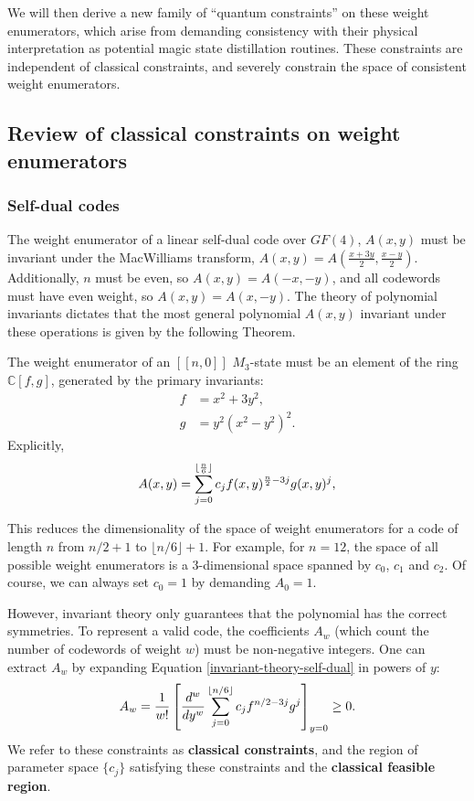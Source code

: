 \documentclass[11pt]{article}
\DeclarePairedDelimiter\floor{\lfloor}{\rfloor}
\begin{document}
We will then derive a new family of ``quantum constraints'' on these weight enumerators, which arise from demanding consistency with their physical interpretation as potential magic state distillation routines. These constraints are independent of classical constraints, and severely constrain the space of consistent weight enumerators. 

\subsection{Review of classical constraints on weight enumerators}
\label{sec:invariant-theory}

\subsubsection{Self-dual codes}
The weight enumerator of a linear self-dual code over $GF(4)$, $A(x,y)$ must be invariant under the MacWilliams transform, $A(x,y) = A(\frac{x+3y}{2}, \frac{x-y}{2})$. Additionally, $n$ must be even, so $A(x,y)=A(-x,-y)$, and all codewords must have even weight, so $A(x,y)=A(x,-y)$.
The theory of polynomial invariants \cite{sloane1977error, macwilliams1978self, nebe2006self} dictates that the most general polynomial $A(x,y)$ invariant under these operations is given by the following Theorem.
\begin{theorem} \label{thm:self-dual-invariant-theory}
    The weight enumerator of an $[[n,0]]$ $M_3$-state must be an element of the ring $\mathbb{C}[f,g]$, generated by the primary invariants:
\begin{align}
    f &= x^2 + 3y^2, \\
    g &= y^2(x^2-y^2)^2.
\end{align}
Explicitly, 
\begin{equation}
    A(x,y) = \sum_{j=0}^{\floor{\frac{n}{6}}} c_j {f}(x,y)^{\frac{n}{2}-3j} {g}(x,y)^j, \label{eq:invariant-theory-self-dual}
\end{equation}
\end{theorem}
This reduces the dimensionality of the space of weight enumerators for a code of length $n$ from $n/2+1$ to $ \lfloor n/6 \rfloor + 1$. For example, for $n=12$, the space of all possible weight enumerators is a 3-dimensional space spanned by $c_0$, $c_1$ and $c_2$. Of course, we can always set $c_0=1$ by demanding $A_0=1$.

However, invariant theory only guarantees that the polynomial has the correct symmetries. To represent a valid code, the coefficients $A_w$ (which count the number of codewords of weight $w$) must be non-negative integers. One can extract $A_w$ by expanding Equation \eqref{invariant-theory-self-dual} in powers of $y$:
\begin{equation}
    A_{w} = \frac{1}{w!} \left[\frac{d^w}{dy^w}\sum_{j=0}^{\floor{n/6}} c_j f^{n/2-3j}g^j\right]_{y=0} \geq 0. \label{eq:classical-constraints}
\end{equation}
We refer to these constraints as \textbf{classical constraints}, and the region of parameter space $\{c_j\}$ satisfying these constraints and the \textbf{classical feasible region}. 
\end{document}
